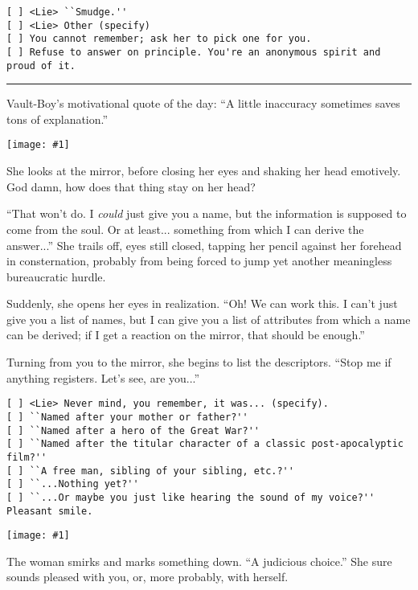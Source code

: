 \documentclass[a4paper,12pt]{book}
\newenvironment{commentary}%
	{
		\vfill%
		\hrule%
		\begin{footnotesize}%
		\color{MidnightBlue}%
	}%
	{%
		\end{footnotesize}%
	}
\newcommand{\img}[1]{%
	\texttt{[image: \#1]}%
}
\begin{document}
\begin{verbatim}
[ ] <Lie> ``Smudge.''
[ ] <Lie> Other (specify)
[ ] You cannot remember; ask her to pick one for you.
[ ] Refuse to answer on principle. You're an anonymous spirit and proud of it.
\end{verbatim}

\begin{commentary}
Vault-Boy's motivational quote of the day: ``A little inaccuracy sometimes saves tons of explanation.''
\end{commentary}



\newpage

\img{siki-four}

She looks at the mirror, before closing her eyes and shaking her head emotively. God damn, how does that thing stay on her head?

``That won't do. I \emph{could} just give you a name, but the information is supposed to come from the soul. Or at least... something from which I can derive the answer...'' She trails off, eyes still closed, tapping her pencil against her forehead in consternation, probably from being forced to jump yet another meaningless bureaucratic hurdle.

Suddenly, she opens her eyes in realization. ``Oh! We can work this. I can't just give you a list of names, but I can give you a list of attributes from which a name can be derived; if I get a reaction on the mirror, that should be enough.''

Turning from you to the mirror, she begins to list the descriptors. ``Stop me if anything registers. Let's see, are you...''

\begin{small}
\begin{verbatim}
[ ] <Lie> Never mind, you remember, it was... (specify).
[ ] ``Named after your mother or father?''
[ ] ``Named after a hero of the Great War?''
[ ] ``Named after the titular character of a classic post-apocalyptic film?''
[ ] ``A free man, sibling of your sibling, etc.?''
[ ] ``...Nothing yet?''
[ ] ``...Or maybe you just like hearing the sound of my voice?'' Pleasant smile.
\end{verbatim}
\end{small}



\newpage

\img{siki-five}

The woman smirks and marks something down. ``A judicious choice.'' She sure sounds pleased with you, or, more probably, with herself.
\end{document}
